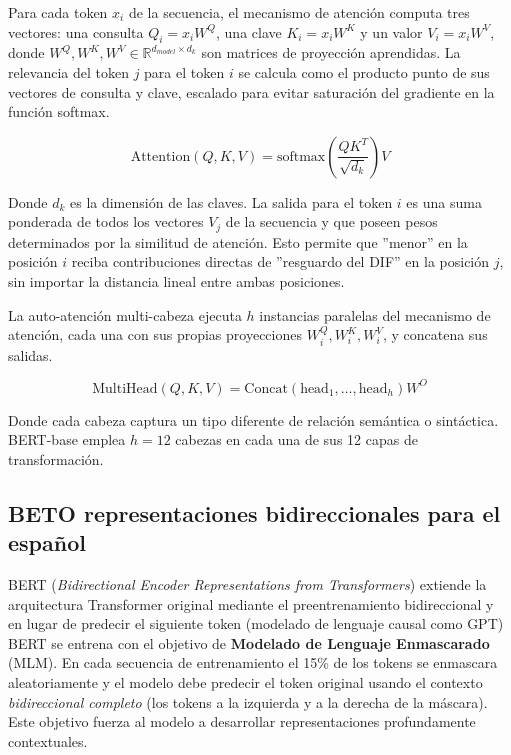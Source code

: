 Para cada token $x_i$ de la secuencia, el mecanismo de atención computa tres
vectores: una consulta $Q_i = x_i W^Q$, una clave $K_i = x_i W^K$ y un valor
$V_i = x_i W^V$, donde $W^Q, W^K, W^V \in \mathbb{R}^{d_{model} \times d_k}$ son
matrices de proyección aprendidas. La relevancia del token $j$ para el token $i$
se calcula como el producto punto de sus vectores de consulta y clave, escalado
para evitar saturación del gradiente en la función softmax.

\begin{equation}
    \text{Attention}(Q, K, V) = \text{softmax}\!\left(\frac{QK^T}{\sqrt{d_k}}\right)V
\end{equation}

Donde $d_k$ es la dimensión de las claves. La salida para el token $i$ es una
suma ponderada de todos los vectores $V_j$ de la secuencia y que poseen pesos determinados
por la similitud de atención. Esto permite que ''menor'' en la posición $i$ reciba
contribuciones directas de ''resguardo del DIF'' en la posición $j$, sin importar
la distancia lineal entre ambas posiciones.

La auto-atención multi-cabeza ejecuta $h$ instancias paralelas del mecanismo
de atención, cada una con sus propias proyecciones $W^Q_i, W^K_i, W^V_i$,
y concatena sus salidas.

\begin{equation}
    \text{MultiHead}(Q, K, V) = \text{Concat}(\text{head}_1, \ldots, \text{head}_h) W^O
\end{equation}

Donde cada cabeza captura un tipo diferente de relación semántica o sintáctica.
BERT-base emplea $h=12$ cabezas en cada una de sus 12 capas de transformación.


\subsection{BETO representaciones bidireccionales para el español}
\label{subsec:mt_beto}


BERT (\textit{Bidirectional Encoder Representations from Transformers})
\cite{devlin2019bert} extiende la arquitectura Transformer original mediante el
preentrenamiento bidireccional y en lugar de predecir el siguiente token (modelado
de lenguaje causal como GPT) BERT se entrena con el objetivo de
\textbf{Modelado de Lenguaje Enmascarado} (MLM). En cada secuencia de entrenamiento
el 15\% de los tokens se enmascara aleatoriamente y el modelo debe predecir el token
original usando el contexto \textit{bidireccional completo} (los tokens a la izquierda
y a la derecha de la máscara). Este objetivo fuerza al modelo a desarrollar representaciones
profundamente contextuales.

